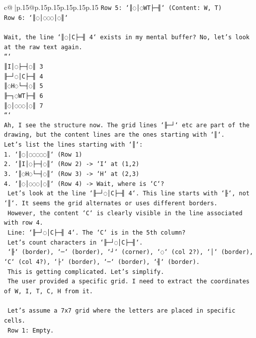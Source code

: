 \documentclass{article}
\begin{document}
{\begin{supertabular}{c@{$\;$}|p{.15\linewidth}@{}p{.15\linewidth}p{.15\linewidth}p{.15\linewidth}p{.15\linewidth}p{.15\linewidth}}
{{{\texttt{Row 5: `║◌│◌WT├─╢` (Content: W, T)} \\
\texttt{Row 6: `║◌│◌◌◌│◌║`} \\
\\ 
\texttt{Wait, the line `║◌│C├─╢ 4` exists in my mental buffer? No, let's look at the raw text again.} \\
\texttt{```} \\
\texttt{║I│◌├─┤◌║ 3} \\
\texttt{╟─┘◌│C├─╢ 4} \\
\texttt{║◌H◌└─┤◌║ 5} \\
\texttt{╟─┐◌WT├─╢ 6} \\
\texttt{║◌│◌◌◌│◌║ 7} \\
\texttt{```} \\
\texttt{Ah, I see the structure now. The grid lines `╟─┘` etc are part of the drawing, but the content lines are the ones starting with `║`.} \\
\texttt{Let's list the lines starting with `║`:} \\
\texttt{1. `║◌│◌◌◌◌◌║` (Row 1)} \\
\texttt{2. `║I│◌├─┤◌║` (Row 2) {-}> `I` at (1,2)} \\
\texttt{3. `║◌H◌└─┤◌║` (Row 3) {-}> `H` at (2,3)} \\
\texttt{4. `║◌│◌◌◌│◌║` (Row 4) {-}> Wait, where is `C`?} \\
\texttt{   Let's look at the line `╟─┘◌│C├─╢ 4`. This line starts with `╟`, not `║`. It seems the grid alternates or uses different borders.} \\
\texttt{   However, the content `C` is clearly visible in the line associated with row 4.} \\
\texttt{   Line: `╟─┘◌│C├─╢ 4`. The `C` is in the 5th column?} \\
\texttt{   Let's count characters in `╟─┘◌│C├─╢`.} \\
\texttt{   `╟` (border), `─` (border), `┘` (corner), `◌` (col 2?), `│` (border), `C` (col 4?), `├` (border), `─` (border), `╢` (border).} \\
\texttt{   This is getting complicated. Let's simplify.} \\
\texttt{   The user provided a specific grid. I need to extract the coordinates of W, I, T, C, H from it.} \\
\\ 
\texttt{   Let's assume a 7x7 grid where the letters are placed in specific cells.} \\
\texttt{   Row 1: Empty.} \\
}}}
\end{supertabular}}
\end{document}
